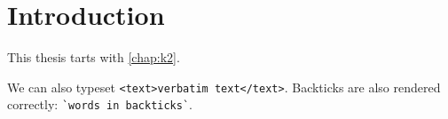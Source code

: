 \chapter{Introduction}

    This thesis tarts with \cref{chap:k2}.

    We can also typeset \verb|<text>verbatim text</text>|.
    Backticks are also rendered correctly: \verb|`words in backticks`|.
